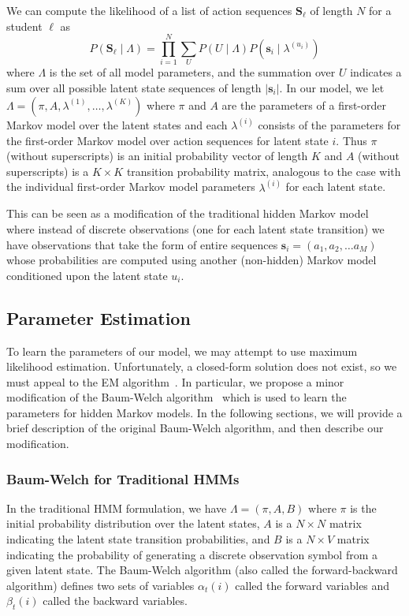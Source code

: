 We can compute the likelihood of a list of action sequences
$\mathbf{S}_\ell$ of length $N$ for a student $\ell$ as
\begin{equation}
  P(\mathbf{S}_\ell \mid \Lambda)
  = \prod_{i=1}^N \sum_U P(U \mid \Lambda) P(\mathbf{s}_i \mid
  \lambda^{(u_i)})
\end{equation}
where $\Lambda$ is the set of all model parameters, and the summation over
$U$ indicates a sum over all possible latent state sequences of length
$|\mathbf{s}_i|$. In our model, we let $\Lambda = (\pi, A, \lambda^{(1)},
\ldots, \lambda^{(K)})$ where $\pi$ and $A$ are the parameters of a first-order
Markov model over the latent states and each $\lambda^{(i)}$ consists of
the parameters for the first-order Markov model over action sequences for
latent state $i$. Thus $\pi$ (without superscripts) is an initial
probability vector of length $K$ and $A$ (without superscripts) is a $K
\times K$ transition probability matrix, analogous to the case with the
individual first-order Markov model parameters $\lambda^{(i)}$ for each
latent state.

This can be seen as a modification of the traditional hidden Markov
model~\cite{Rabiner:1990:RSR} where instead of discrete observations (one
for each latent state transition) we have observations that take the form
of entire sequences $\mathbf{s}_i = (a_1, a_2, \ldots a_M)$ whose
probabilities are computed using another (non-hidden) Markov model
conditioned upon the latent state $u_i$.

\subsection{Parameter Estimation}
To learn the parameters of our model, we may attempt to use maximum
likelihood estimation. Unfortunately, a closed-form solution does not
exist, so we must appeal to the EM algorithm~\cite{Dempster:1977:JRSS}. In
particular, we propose a minor modification of the Baum-Welch
algorithm~\cite{Rabiner:1990:RSR} which is used to learn the parameters for
hidden Markov models. In the following sections, we will provide a brief
description of the original Baum-Welch algorithm, and then describe our
modification.

\subsubsection{Baum-Welch for Traditional HMMs}
In the traditional HMM formulation, we have $\Lambda = (\pi, A, B)$ where
$\pi$ is the initial probability distribution over the latent states,
$A$ is a $N\times N$ matrix indicating the latent state transition
probabilities, and $B$ is a $N \times V$ matrix indicating the probability
of generating a discrete observation symbol from a given latent state. The
Baum-Welch algorithm (also called the forward-backward algorithm) defines
two sets of variables $\alpha_t(i)$ called the forward variables and
$\beta_t(i)$ called the backward variables.

